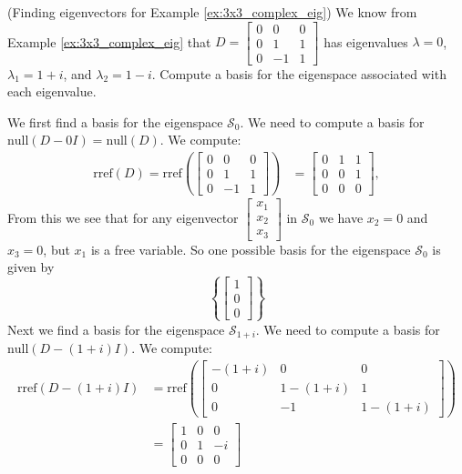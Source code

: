 \documentclass{ximera}
\begin{document}
\begin{example}\label{ex:3x3_complex_ev} (Finding eigenvectors for Example \ref{ex:3x3_complex_eig})
We know from Example \ref{ex:3x3_complex_eig} that $D=\begin{bmatrix} 0&0&0\\ 0 &1&1\\ 0 & -1&1\end{bmatrix}$ has eigenvalues $\lambda=0$, $\lambda_1=1+i$, and $\lambda_2=1-i$.  Compute a basis for the eigenspace associated with each eigenvalue.
\begin{explanation}
We first find a basis for the eigenspace $\mathcal{S}_0$.  We need to compute a basis for $\mbox{null}(D-0I)=\mbox{null}(D)$.  We compute:
\begin{align*}\mbox{rref}(D)=\mbox{rref}\left(\begin{bmatrix} 0&0&0\\ 0 &1&1\\ 0 & -1&1\end{bmatrix}\right)&=\begin{bmatrix} 0 & 1 & 1\\ 0 & 0 & 1\\ 0 & 0 & 0\end{bmatrix},
\end{align*}
From this we see that for any eigenvector $\begin{bmatrix}x_1\\x_2\\x_3\end{bmatrix}$ in $\mathcal{S}_0$ we have $x_2=0$ and $x_3=0$, but $x_1$ is a free variable. 
So one possible basis for the eigenspace $\mathcal{S}_0$ is given by $$\left\{\begin{bmatrix}1\\0\\0\end{bmatrix}\right\}$$
Next we find a basis for the eigenspace $\mathcal{S}_{1+i}$.  We need to compute a basis for $\mbox{null}(D-(1+i)I)$.  We compute:
\begin{align*}\mbox{rref}(D-(1+i)I)&=\mbox{rref}\left(\begin{bmatrix} -(1+i)&0&0\\ 0 &1-(1+i)&1\\ 0 & -1&1-(1+i)\end{bmatrix}\right) \\
&=\begin{bmatrix} 1 & 0 &0\\ 0 & 1 & -i\\ 0 & 0 & 0\end{bmatrix}

\end{align*}
\end{explanation}
\end{example}
\end{document}
